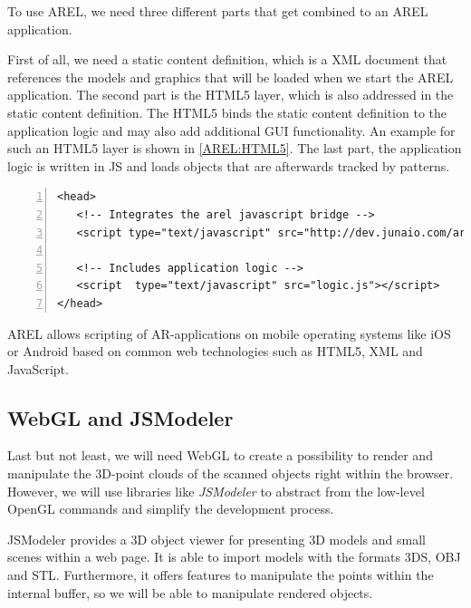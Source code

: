 To use \ac{AREL}, we need three different parts that get combined to an \ac{AREL} application.

\clearpage 

First of all, we need a static content definition, which is a \ac{XML} document that references the models and graphics that will be loaded when we start the \ac{AREL} application. The second part is the \ac{HTML5} layer, which is also addressed in the static content definition. The \ac{HTML5} binds the static content definition to the application logic and may also add additional \ac{GUI} functionality. An example for such an \ac{HTML5} layer is shown in \ref{AREL:HTML5}. The last part, the application logic is written in \ac{JS} and loads objects that are afterwards tracked by patterns.  

\begin{lstlisting}[numbers=left,caption={Example for the \ac{HTML5} \ac{AREL} layer},label=AREL:HTML5,frame=tlbr,breaklines]
<head>
   <!-- Integrates the arel javascript bridge -->
   <script type="text/javascript" src="http://dev.junaio.com/arel/js/arel.js"></script>

   <!-- Includes application logic -->
   <script  type="text/javascript" src="logic.js"></script>
</head>
\end{lstlisting}

\ac{AREL} allows scripting of \ac{AR}-applications on mobile operating systems like iOS or Android based on common web technologies such as \ac{HTML5}, \ac{XML} and JavaScript. 

\subsection{WebGL and JSModeler}
Last but not least, we will need \ac{WebGL} to create a possibility to render and manipulate the 3D-point clouds of the scanned objects right within the browser. However, we will use libraries like \emph{JSModeler} to abstract from the low-level OpenGL commands and simplify the development process.

JSModeler provides a 3D object viewer for presenting 3D models and small scenes within a web page. It is able to import models with the formats 3DS, OBJ and STL. Furthermore, it offers features to manipulate the points within the internal buffer, so we will be able to manipulate rendered objects. 

